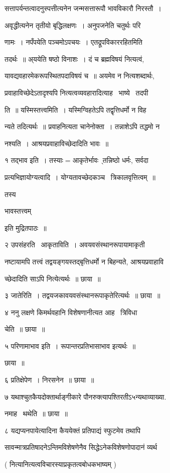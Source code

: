 \documentclass[11pt, openany]{book}
\begin{document}
सत्तापर्यन्तत्वादनुस्पत्तीत्यनेन जन्मसत्तारूपौ भावविकारौ निरस्तौ~। 

अवृद्धीत्यनेन तृतीयो बृद्धिलक्षणः~। अनुपजनेति चतुर्थः परि \textendash\ 

णामः~। नपँपयेति पञ्चमोऽपचयः~। एतद्रूपविकाररहितमिति 

तदर्थः~॥ अ्ययेति षष्ठो विनाशः~। दं च ब्रह्मविषयं नित्यत्वं, 

यावद्यवहारमेकरूपस्थितपदाविषयं च~॥ अयमेव न नित्यशब्दार्थः, 

प्रवाहाविच्छेदेऽतादृश्यपि नित्यत्वव्यवहारादित्याह \textendash\ भाष्ये \textendash\ तदपी \textendash\ 

ति~॥ यस्मिस्तत्त्वमिति~। यस्मिग्विहतेऽपि तद्वृत्तिधर्मो न विह \textendash\ 

न्यते तदित्यर्थः~॥ प्रवाहनित्यता चानेनोक्ता~। तन्नाशेऽपि तद्धमो न 

नश्यति~। आश्रयप्रवाहाविच्छेदादिति भावः~॥ 

१ तद्भाव इति~। तस्याः$=$आकृतेर्भावः \textendash\ ्तन्निष्ठो धर्मः, सर्वदा \textendash\ 

प्रत्यभिज्ञायोग्यत्वादि~। योग्यतावच्छेदकञ्च \textendash\ त्रिकालवृत्तित्वम्~॥ {\qt तस्य


भावस्तत्त्वम्} इति मुद्रितपाठः~॥ 

२ उपसंहरति \textendash\ आकृताविति~। अवयवसंस्थानरूपायामाकृती 

नष्टायामपि तत्त्वं तद्वयङ्गयस्तद्बृत्तिधर्मो न बिहन्यते,
आश्रयप्रवाहावि \textendash\ 

च्छेदादिति साऽपि नित्येत्यर्थः~॥ छाया~॥ 

३ जातेरिति~। तद्वयजकावयवसंस्थानरूपाकृतेरित्यर्थः~॥ छाया~॥ 

४ ननु लक्षणे किमर्थवहानि विशेषणानीत्यत आह \textendash\ त्रिविधा 

चेति~॥ छाया~॥ 

५ परिणामाभाव इति~। रूपान्तरप्रतिभासाभाव इत्यर्थः~॥ 

छाया~॥ 

६ प्रतिक्षेपेण~। निरसनेन~॥ छाया~॥ 

७ यथाश्चुतकैयदोक्तार्थाङ्गीकारे पौनरुक्त्यापश्तिरतीऽ५न्यथाव्याख्या. 

नमाह \textendash\ थथेति~॥ छाया~॥ 

८ यद्यप्यनपायेत्यादिना कैययेक्तं प्रतिपाद्यं स्फुटमेव तथापि 

सावन्मात्रप्रतिषादनेऽन्तिमविशेषणेनैव सिद्धेऽनेकविशेषणोपादानं व्यर्थ \textendash\ 





( नित्यानित्यत्वविचारस्याप्रकृतत्वबोधकभाष्यम् ) 
\end{document}
